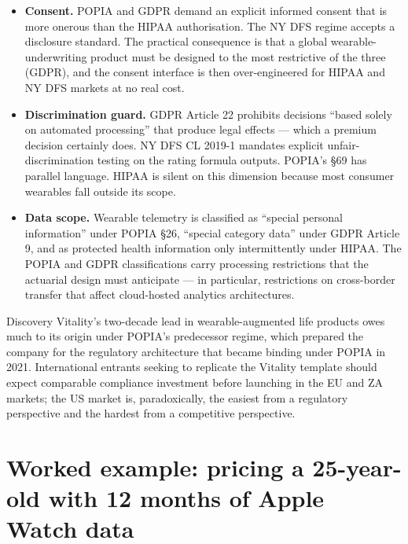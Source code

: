 \begin{itemize}[leftmargin=*,nosep,topsep=4pt]
   \item \textbf{Consent.} POPIA and GDPR demand an explicit
         informed consent that is more onerous than the HIPAA
         authorisation. The NY DFS regime accepts a disclosure
         standard. The practical consequence is that a global
         wearable-underwriting product must be designed to the most
         restrictive of the three (GDPR), and the consent
         interface is then over-engineered for HIPAA and NY DFS
         markets at no real cost.
   \item \textbf{Discrimination guard.} GDPR Article 22 prohibits
         decisions ``based solely on automated processing'' that
         produce legal effects --- which a premium decision
         certainly does. NY DFS CL 2019-1 mandates explicit
         unfair-discrimination testing on the rating formula
         outputs. POPIA's §69 has parallel language. HIPAA is
         silent on this dimension because most consumer wearables
         fall outside its scope.
   \item \textbf{Data scope.} Wearable telemetry is classified as
         ``special personal information'' under POPIA §26, ``special
         category data'' under GDPR Article 9, and as protected
         health information only intermittently under HIPAA. The
         POPIA and GDPR classifications carry processing
         restrictions that the actuarial design must anticipate ---
         in particular, restrictions on cross-border transfer that
         affect cloud-hosted analytics architectures.
\end{itemize}

\begin{rbox}
Discovery Vitality's two-decade lead in wearable-augmented life
products owes much to its origin under POPIA's predecessor regime,
which prepared the company for the regulatory architecture that
became binding under POPIA in 2021. International entrants seeking
to replicate the Vitality template should expect comparable
compliance investment before launching in the EU and ZA markets;
the US market is, paradoxically, the easiest from a regulatory
perspective and the hardest from a competitive perspective.
\end{rbox}

\section{Worked example: pricing a 25-year-old with 12 months of Apple Watch data}\label{sec:worked}

